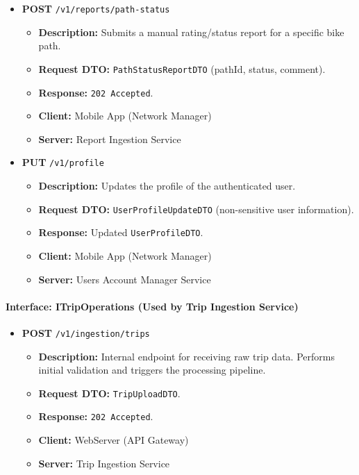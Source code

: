 \begin{itemize}
    \item \textbf{POST} \texttt{/v1/reports/path-status}
    \begin{itemize}
        \item \textbf{Description:} Submits a manual rating/status report for a specific bike path.
        \item \textbf{Request DTO:} \texttt{PathStatusReportDTO} (pathId, status, comment).
        \item \textbf{Response:} \texttt{202 Accepted}.
        \item \textbf{Client:} Mobile App (Network Manager)
        \item \textbf{Server:} Report Ingestion Service
    \end{itemize}
    
    \item \textbf{PUT} \texttt{/v1/profile}
    \begin{itemize}
        \item \textbf{Description:} Updates the profile of the authenticated user.
        \item \textbf{Request DTO:} \texttt{UserProfileUpdateDTO} (non-sensitive user information).
        \item \textbf{Response:} Updated \texttt{UserProfileDTO}.
        \item \textbf{Client:} Mobile App (Network Manager)
        \item \textbf{Server:} Users Account Manager Service
    \end{itemize}
\end{itemize}

\paragraph{Interface: ITripOperations (Used by Trip Ingestion Service)}
\begin{itemize}
    \item \textbf{POST} \texttt{/v1/ingestion/trips}
    \begin{itemize}
        \item \textbf{Description:} Internal endpoint for receiving raw trip data. Performs initial validation and triggers the processing pipeline.
        \item \textbf{Request DTO:} \texttt{TripUploadDTO}.
        \item \textbf{Response:} \texttt{202 Accepted}.
        \item \textbf{Client:} WebServer (API Gateway)
        \item \textbf{Server:} Trip Ingestion Service
    \end{itemize}
\end{itemize}

